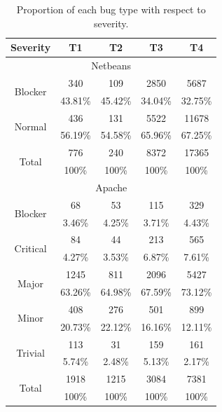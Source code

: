 \noindent{}

\begin{table}[h!]
\centering
\begin{tabular}{c|c|c|c|c}
Severity                  & T1      & T2      & T3      & T4      \\
\hline \hline
\multicolumn{5}{c}{Netbeans}                                      \\ \hline
\multirow{2}{*}{Blocker}  & 340     & 109     & 2850    & 5687    \\
                          & 43.81\% & 45.42\% & 34.04\% & 32.75\% \\ \hline
\multirow{2}{*}{Normal}   & 436     & 131     & 5522    & 11678   \\
                          & 56.19\% & 54.58\% & 65.96\% & 67.25\% \\
                          \hline
\multirow{2}{*}{Total}    & 776     & 240     & 8372    & 17365   \\
                          & 100\%   & 100\%   & 100\%   & 100\%   \\
\hline \hline
\multicolumn{5}{c}{Apache}                                        \\ \hline
\multirow{2}{*}{Blocker}  & 68      & 53      & 115     & 329     \\
                          & 3.46\%  & 4.25\%  & 3.71\%  & 4.43\%  \\
                          \hline
\multirow{2}{*}{Critical} & 84      & 44      & 213     & 565     \\
                          & 4.27\%  & 3.53\%  & 6.87\%  & 7.61\%  \\
                          \hline
\multirow{2}{*}{Major}    & 1245    & 811     & 2096    & 5427    \\
                          & 63.26\% & 64.98\% & 67.59\% & 73.12\% \\
                          \hline
\multirow{2}{*}{Minor}    & 408     & 276     & 501     & 899     \\
                          & 20.73\% & 22.12\% & 16.16\% & 12.11\% \\
                          \hline
\multirow{2}{*}{Trivial}  & 113     & 31      & 159     & 161     \\
                          & 5.74\%  & 2.48\%  & 5.13\%  & 2.17\%  \\
                          \hline
\multirow{2}{*}{Total}    & 1918    & 1215    & 3084    & 7381    \\
                          & 100\%   & 100\%   & 100\%   & 100\%  \\
\hline \hline
\end{tabular}
\caption{Proportion of each bug type with respect to severity.}
\label{tab:bug-taxo-rq2-severity}
\end{table}

